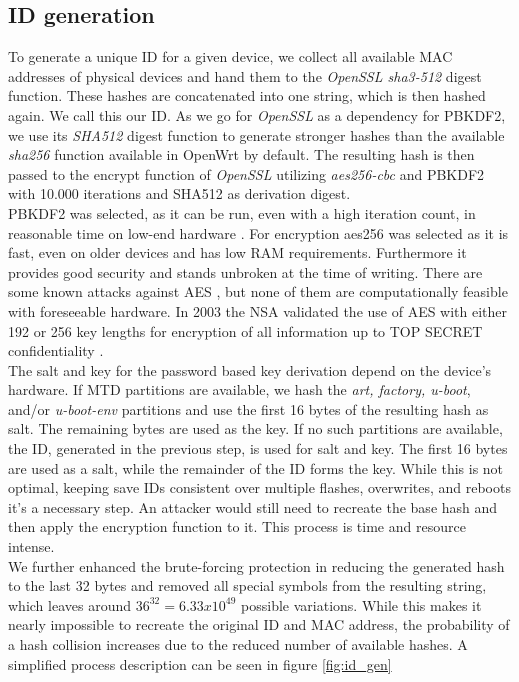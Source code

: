 \subsection{ID generation}
    To generate a unique ID for a given device, we collect all available MAC addresses of physical devices and hand them to the \textit{OpenSSL sha3-512} digest function. These hashes are concatenated into one string, which is then hashed again. We call this our ID. As we go for \textit{OpenSSL} as a dependency for PBKDF2, we use its \textit{SHA512} digest function to generate stronger hashes than the available \textit{sha256} function available in OpenWrt by default. The resulting hash is then passed to the encrypt function of \textit{OpenSSL} utilizing \textit{aes256-cbc} and PBKDF2 with 10.000 iterations and SHA512 as derivation digest.\\
    PBKDF2 was selected, as it can be run, even with a high iteration count, in reasonable time on low-end hardware \cite{ertaul_implementation_2016}. For encryption aes256 was selected as it is fast, even on older devices and has low RAM requirements. Furthermore it provides good security and stands unbroken at the time of writing. There are some known attacks against AES  \cite{schneier_another_2009} \cite{lu_new_2008} \cite{bernstein_cache-timing_nodate} \cite{biryukov_key_2009}, but none of them are computationally feasible with foreseeable hardware. In 2003 the NSA validated the use of AES with either 192 or 256 key lengths for encryption of all information up to TOP SECRET confidentiality \cite{noauthor_national_2003}.\\
    
    The salt and key for the password based key derivation depend on the device's hardware. If MTD partitions are available, we hash the \textit{art, factory, u-boot}, and/or \textit{u-boot-env} partitions and use the first 16 bytes of the resulting hash as salt. The remaining bytes are used as the key. If no such partitions are available, the ID, generated in the previous step, is used for salt and key. The first 16 bytes are used as a salt, while the remainder of the ID forms the key. While this is not optimal, keeping save IDs consistent over multiple flashes, overwrites, and reboots it's a necessary step. An attacker would still need to recreate the base hash and then apply the encryption function to it. This process is time and resource intense.\\
    
     We further enhanced the brute-forcing protection in reducing the generated hash to the last 32 bytes and removed all special symbols from the resulting string, which leaves around $36^{32} = 6.33x10^{49}$ possible variations. While this makes it nearly impossible to recreate the original ID and MAC address, the probability of a hash collision increases due to the reduced number of available hashes. A simplified process description can be seen in figure \ref{fig:id_gen}\\
     

